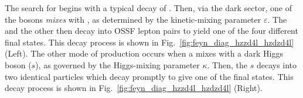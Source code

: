 The search for \PZD begins with a typical decay of \htozznostar.
Then, via the dark sector, one of the \PZ bosons \emph{mixes} with \PZD, as determined by the kinetic-mixing parameter $\varepsilon$.
The \PZD and the other \PZ then decay into OSSF lepton pairs to yield one of the four different \fourl final states.
This decay process is shown in Fig.~\ref{fig:feyn_diag_hzzd4l_hzdzd4l} (Left).
The other mode of \PZD production occurs when a \PH mixes with a dark Higgs boson ($s$), as governed by the Higgs-mixing parameter $\kappa$.  %
Then, the $s$ decays into two identical \PZD particles which decay promptly to give one of the \fourl final states.
This decay process is shown in Fig.~\ref{fig:feyn_diag_hzzd4l_hzdzd4l} (Right).
